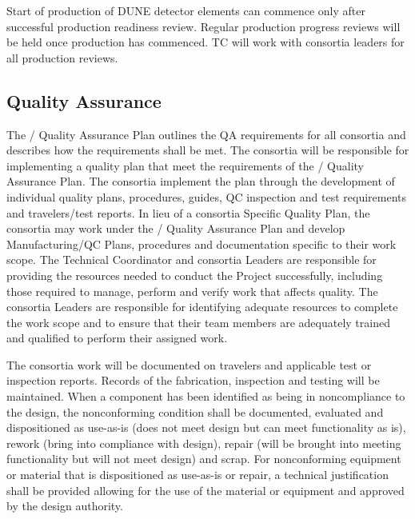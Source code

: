 Start of production of DUNE detector elements can commence only after
successful production readiness review. Regular production progress
reviews will be held once production has commenced. TC will work with
consortia leaders for all production reviews.

\subsection{Quality Assurance}
\label{sec:fdsp-coord-qa}


The / Quality Assurance Plan outlines the QA
requirements for all  consortia and describes how the
requirements shall be met. The consortia will be responsible for
implementing a quality plan that meet the requirements of the
/ Quality Assurance Plan.  The consortia
implement the plan through the development of individual quality
plans, procedures, guides, QC inspection and test requirements and
travelers/test reports.  In lieu of a consortia Specific Quality Plan,
the consortia may work under the / Quality
Assurance Plan and develop Manufacturing/QC Plans, procedures and
documentation specific to their work scope.  The 
Technical Coordinator and consortia Leaders are responsible for
providing the resources needed to conduct the Project successfully,
including those required to manage, perform and verify work that
affects quality.  The  consortia Leaders are responsible
for identifying adequate resources to complete the work scope and to
ensure that their team members are adequately trained and qualified to
perform their assigned work.

The consortia work will be documented on travelers and applicable test
or inspection reports. Records of the fabrication, inspection and
testing will be maintained. When a component has been identified as
being in noncompliance to the design, the nonconforming condition
shall be documented, evaluated and dispositioned as use-as-is (does
not meet design but can meet functionality as is), rework (bring into
compliance with design), repair (will be brought into meeting
functionality but will not meet design) and scrap. For nonconforming
equipment or material that is dispositioned as use-as-is or repair, a
technical justification shall be provided allowing for the use of the
material or equipment and approved by the design authority.

